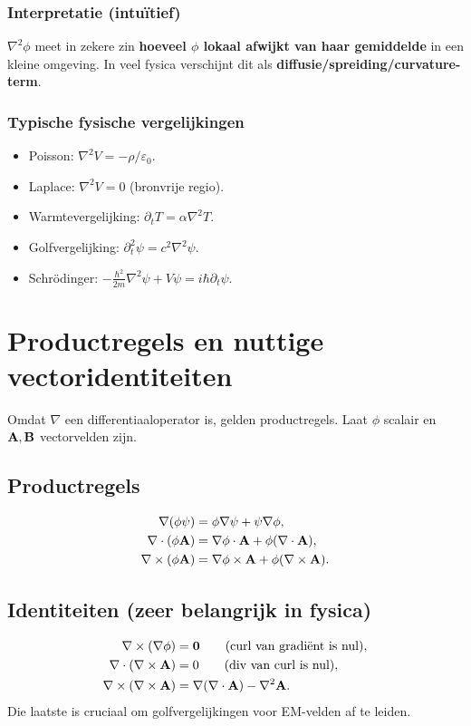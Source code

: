 \documentclass[11pt,a4paper]{article}
\begin{document}
    \subsubsection{Interpretatie (intu\"itief)}
    \(\nabla^2\phi\) meet in zekere zin \textbf{hoeveel \(\phi\) lokaal afwijkt van haar gemiddelde} in een kleine omgeving.
    In veel fysica verschijnt dit als \textbf{diffusie/spreiding/curvature-term}.

    \subsubsection{Typische fysische vergelijkingen}
    \begin{itemize}
        \item Poisson: \(\nabla^2 V = -\rho/\varepsilon_0\).
        \item Laplace: \(\nabla^2 V=0\) (bronvrije regio).
        \item Warmtevergelijking: \(\partial_t T = \alpha \nabla^2 T\).
        \item Golfvergelijking: \(\partial_t^2 \psi = c^2 \nabla^2 \psi\).
        \item Schr\"odinger: \(-\frac{\hbar^2}{2m}\nabla^2\psi + V\psi = i\hbar \partial_t\psi\).
    \end{itemize}



    \section{Productregels en nuttige vectoridentiteiten}
    Omdat \(\nabla\) een differentiaaloperator is, gelden productregels.
    Laat \(\phi\) scalair en \(\vb{A},\vb{B}\) vectorvelden zijn.

    \subsection{Productregels}
    \begin{align}
        \nabla(\phi\psi) &= \phi\nabla\psi + \psi\nabla\phi,\\
        \nabla\cdot(\phi\vb{A}) &= \nabla\phi\cdot\vb{A} + \phi(\nabla\cdot\vb{A}),\\
        \nabla\times(\phi\vb{A}) &= \nabla\phi\times\vb{A} + \phi(\nabla\times\vb{A}).
    \end{align}

    \subsection{Identiteiten (zeer belangrijk in fysica)}
    \begin{align}
        \nabla\times(\nabla\phi) &= \vb{0} \qquad \text{(curl van gradi\"ent is nul)},\\
        \nabla\cdot(\nabla\times\vb{A}) &= 0 \qquad \text{(div van curl is nul)},\\
        \nabla\times(\nabla\times\vb{A}) &= \nabla(\nabla\cdot\vb{A}) - \nabla^2 \vb{A}.
    \end{align}
    Die laatste is cruciaal om golfvergelijkingen voor EM-velden af te leiden.
\end{document}
